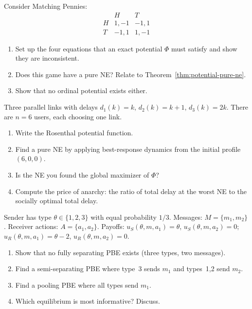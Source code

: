 \documentclass[11pt,a4paper]{article}
\begin{document}
\begin{exercise}
\label{ex:not-potential}
Consider Matching Pennies:
\[
\begin{array}{c|cc}
  & H & T \\ \hline
H & 1,-1 & -1,1 \\
T & -1,1 & 1,-1
\end{array}
\]
\begin{enumerate}[label=(\alph*)]
    \item Set up the four equations that an exact potential $\Phi$ must
    satisfy and show they are inconsistent.
    \item Does this game have a pure NE? Relate to
    Theorem~\ref{thm:potential-pure-ne}.
    \item Show that no ordinal potential exists either.
\end{enumerate}
\end{exercise}

\begin{exercise}
\label{ex:routing-three}
Three parallel links with delays $d_1(k) = k$, $d_2(k) = k + 1$,
$d_3(k) = 2k$. There are $n = 6$ users, each choosing one link.
\begin{enumerate}[label=(\alph*)]
    \item Write the Rosenthal potential function.
    \item Find a pure NE by applying best-response dynamics from the
    initial profile $(6, 0, 0)$.
    \item Is the NE you found the global maximizer of $\Phi$?
    \item Compute the price of anarchy: the ratio of total delay at the
    worst NE to the socially optimal total delay.
\end{enumerate}
\end{exercise}

\begin{exercise}
\label{ex:pbe-three-types}
Sender has type $\theta \in \{1,2,3\}$ with equal probability $1/3$.
Messages: $M = \{m_1, m_2\}$. Receiver actions: $A = \{a_1, a_2\}$.
Payoffs: $u_S(\theta, m, a_1) = \theta$, $u_S(\theta, m, a_2) = 0$;
$u_R(\theta, m, a_1) = \theta - 2$, $u_R(\theta, m, a_2) = 0$.
\begin{enumerate}[label=(\alph*)]
    \item Show that no fully separating PBE exists (three types, two
    messages).
    \item Find a semi-separating PBE where type~3 sends $m_1$ and
    types~1,2 send $m_2$.
    \item Find a pooling PBE where all types send $m_1$.
    \item Which equilibrium is most informative? Discuss.
\end{enumerate}
\end{exercise}
\end{document}
